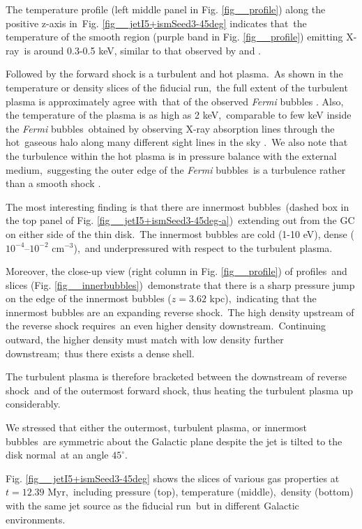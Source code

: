 \documentclass[fleqn,usenatbib,useAMS]{mnras}
\begin{document}
 The temperature profile (left middle panel in Fig. \ref{fig__profile}) along the positive z-axis in\
 Fig. \ref{fig__jetI5+ismSeed3-45deg} indicates that\
 the temperature of the smooth region (purple band in Fig. \ref{fig__profile}) emitting X-ray\
 is around 0.3-0.5 keV, similar to that observed by \citet{Miller2016} and \citet{Kataoka2018}.

 Followed by the forward shock is a turbulent and hot plasma.\
 As shown in the temperature or density slices of the fiducial run,\
 the full extent of the turbulent plasma is approximately agree with\
 that of the observed \textit{Fermi} bubbles \citep{Su2010}.
 Also, the temperature of the plasma is as high as 2 keV,\
 comparable to few keV inside the \textit{Fermi} bubbles\
 obtained by observing X-ray absorption lines through the hot\
 gaseous halo along many different sight lines in the sky \citep{Miller_2013}.\
 We also note that the turbulence within the hot plasma is in pressure balance with the external medium,\
 suggesting the outer edge of the \textit{Fermi} bubbles\
 is a turbulence rather than a smooth shock \citep{Zhang2020}.


 The most interesting finding is that there are innermost bubbles\
 (dashed box in the top panel of Fig. \ref{fig__jetI5+ismSeed3-45deg-a})\
 extending out from the GC on either side of the thin disk.\
 The innermost bubbles are cold (1-10 eV), dense ($10^{-4}$--$10^{-2}$ cm$^{-3}$),\
 and underpressured with respect to the turbulent plasma.\


 Moreover, the close-up view (right column in Fig. \ref{fig__profile}) of profiles\
 and slices (Fig. \ref{fig__innerbubbles})\
 demonstrate that there is a sharp pressure jump on the edge of the innermost bubbles ($z=3.62$ kpc),\
 indicating that the innermost bubbles are an expanding reverse shock.\
 The high density upstream of the reverse shock requires\
 an even higher density downstream.\
 Continuing outward, the higher density must match with low density further downstream;\
 thus there exists a dense shell.

 The turbulent plasma is therefore bracketed between the downstream of reverse shock\
 and of the outermost forward shock, thus heating the turbulent plasma up considerably.


 We stressed that either the outermost, turbulent plasma, or innermost bubbles\
 are symmetric about the Galactic plane despite the jet is tilted to the disk normal\
 at an angle $45^{\circ}$.

 Fig. \ref{fig__jetI5+ismSeed3-45deg} shows the slices of various gas properties at $t=12.39$ Myr,\
 including pressure (top), temperature (middle),\
 density (bottom) with the same jet source as the fiducial run\
 but in different Galactic environments.
\end{document}

